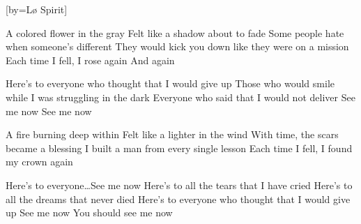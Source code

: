 


[by=L\o{} Spirit]

\beginverse*
{\nolyrics Jam chart (approx.): \[Am] \[F] \[C] \[G] \quad (Loop)}
\endverse

\beginverse
A colored flower in the gray \brk  Felt like a shadow about to fade
Some people hate when someone's different \brk  They would kick you down like they were on a mission
Each time I fell, I rose again \brk  And again
\endverse

\beginchorus
Here's to everyone who thought that I would give up
Those who would smile while I was struggling in the dark
Everyone who said that I would not deliver
See me now \brk  See me now
\endchorus

\beginverse
A fire burning deep within \brk  Felt like a lighter in the wind
With time, the scars became a blessing \brk  I built a man from every single lesson
Each time I fell, I found my crown again
\endverse

\beginchorus
{} Here's to everyone\ldots See me now
Here's to all the tears that I have cried \brk  Here's to all the dreams that never died
Here's to everyone who thought that I would give up
See me now \brk  You should see me now
\endchorus

\endsong
